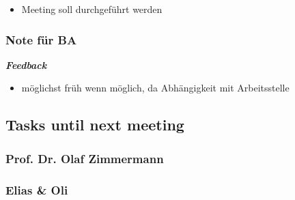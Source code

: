 \begin{itemize}
\item Meeting soll durchgeführt werden
\end{itemize}

\hypertarget{note-fuxfcr-ba}{%
\subsubsection*{Note für BA}\label{note-fuxfcr-ba}}

\emph{\textbf{Feedback}}

\begin{itemize}
\item möglichst früh wenn möglich, da Abhängigkeit mit Arbeitsstelle
\end{itemize}

\hypertarget{tasks-until-next-meeting}{%
\subsection*{Tasks until next meeting}\label{tasks-until-next-meeting}}

\hypertarget{prof-dr-olaf-zimmermann}{%
\subsubsection*{Prof. Dr. Olaf
Zimmermann}\label{prof-dr-olaf-zimmermann}}

\hypertarget{elias--oli}{%
\subsubsection*{Elias \& Oli}\label{elias--oli}}